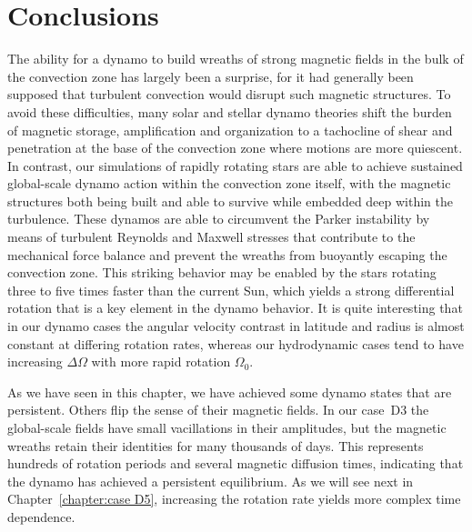 \section{Conclusions}

The ability for a dynamo to build wreaths of strong magnetic fields in the bulk of
the convection zone has largely been a surprise, for it had generally
been supposed that turbulent convection would disrupt such magnetic
structures.  To avoid these difficulties, many solar and stellar
dynamo theories shift the burden of magnetic storage, amplification
and organization to a tachocline of shear and penetration at the base
of the convection zone where motions are more quiescent.  In contrast,
our simulations of rapidly rotating stars are able to achieve
sustained global-scale dynamo action within the convection zone
itself, with the magnetic structures both being built and able to survive
while embedded deep within the turbulence.  
These dynamos are able to circumvent the Parker instability by means
of turbulent Reynolds and Maxwell stresses that contribute to the
mechanical force balance and prevent the wreaths from buoyantly
escaping the convection zone.  
This striking behavior may be enabled by the stars rotating three to
five times faster than the current Sun, which yields a strong
differential rotation that is a key element in the dynamo behavior.  
It is quite interesting that in our dynamo cases the angular velocity
contrast in latitude and radius is almost constant at differing
rotation rates, whereas our hydrodynamic cases tend to have increasing
$\Delta \Omega$ with more rapid rotation $\Omega_0$.
  
As we have seen in this chapter, we have achieved some dynamo states
that are persistent. Others flip the sense of their magnetic fields.  
In our case~D3 the global-scale fields have small vacillations in
their amplitudes, but the magnetic 
wreaths retain their identities for many thousands of days.  This
represents hundreds of rotation periods and several magnetic diffusion
times, indicating that the dynamo has achieved a persistent
equilibrium.  As we will see next in Chapter~\ref{chapter:case D5},
increasing the rotation rate yields more complex time
dependence.  
